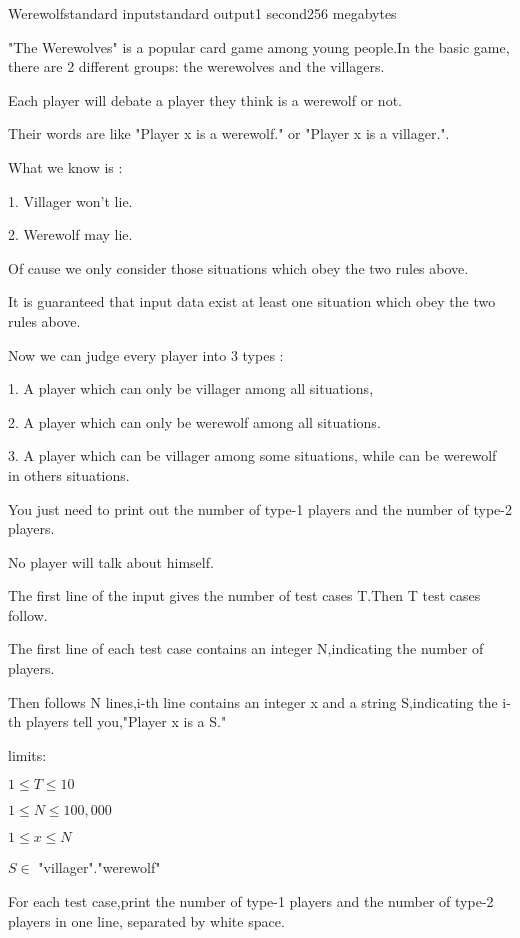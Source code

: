 \begin{problem}{Werewolf}{standard input}{standard output}{1 second}{256 megabytes}

"The Werewolves" is a popular card game among young people.In the basic game, there are 2 different groups: the werewolves and the villagers.

Each player will debate a player they think is a werewolf or not. 

Their words are like "Player x is a werewolf." or "Player x is a villager.".

What we know is :

1. Villager won't lie.

2. Werewolf may lie. 

Of cause we only consider those situations which obey the two rules above. 

It is guaranteed that input data exist at least one situation which obey the two rules above.

Now we can judge every player into 3 types :

1. A player which can only be villager among all situations, 

2. A player which can only be werewolf among all situations.

3. A player which can be villager among some situations, while can be werewolf in others situations.

You just need to print out the number of type-1 players and the number of type-2 players. 

No player will talk about himself.

\InputFile
The first line of the input gives the number of test cases T.Then T test cases follow.

The first line of each test case contains an integer N,indicating the number of players.

Then follows N lines,i-th line contains an integer x and a string S,indicating the i-th players tell you,"Player x is a S."

limits:

$ 1 \leq T \leq 10 $

$ 1 \leq N \leq 100,000 $

$ 1 \leq x \leq N $

$ S \in $ {"villager"."werewolf"}

\OutputFile

For each test case,print the number of type-1 players and the number of type-2 players in one line,  separated by white space.

\Example

\begin{example}
%
\end{example}

\end{problem}

